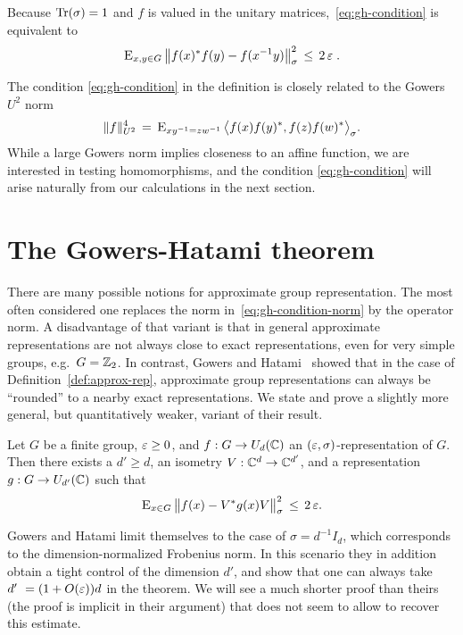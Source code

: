 Because $\mbox{\rm Tr}(\sigma)=1$ and $f$ is valued in the unitary matrices,~\eqref{eq:gh-condition} is equivalent to 
\begin{equation}\label{eq:gh-condition-norm}
\textsc{E}_{x,y\in G} \, \big\| f(x)^*f(y) - f(x^{-1}y) \big\|_\sigma^2 \,\leq\, 2\,\varepsilon\;.
\end{equation} 

\begin{remark}
The condition \eqref{eq:gh-condition} in the definition is closely related to the Gowers $U^2$ norm
$$\|f\|_{U^2}^4 \,=\, \textsc{E}_{xy^{-1}=zw^{-1}}\, \big\langle f(x)f(y)^* ,f(z)f(w)^* \big\rangle_\sigma.$$
While a large Gowers norm implies closeness to an affine function, we are interested in testing homomorphisms, and the condition \eqref{eq:gh-condition} will arise naturally from our calculations in the next section. 
\end{remark}

\section{The Gowers-Hatami theorem}

There are many possible notions for approximate group representation. The most often considered one replaces the norm in~\eqref{eq:gh-condition-norm} by the operator norm. A disadvantage of that variant is that in general approximate representations are not always close to exact representations, even for very simple groups, e.g.\ $G=\mathbb{Z}_2$. In contrast, 
Gowers and Hatami~\cite{gowers2015inverse} showed that in the case of Definition~\ref{def:approx-rep}, approximate group representations can always be ``rounded'' to a nearby exact representations. We state and prove a slightly more general, but quantitatively weaker, variant of their result.

\begin{theorem}\label{thm:gh}
Let $G$ be a finite group, $\varepsilon\geq 0$, and $f:G\to U_d(\mathbb{C})$ an $(\varepsilon,\sigma)$-representation of $G$. Then there exists a $d'\geq d$, an isometry $V:\mathbb{C}^d\to \mathbb{C}^{d'}$, and a representation $g:G\to U_{d'}(\mathbb{C})$ such that 
$$\textsc{E}_{x\in G}\, \big\| f(x) - V^*g(x)V \big\|_\sigma^2\, \leq\, 2\,\varepsilon.$$ 
\end{theorem}

Gowers and Hatami limit themselves to the case of $\sigma = d^{-1}I_d$, which corresponds to the dimension-normalized Frobenius norm. In this scenario they in addition obtain a tight control of the dimension $d'$, and show that one can always take $d'\ = (1+O(\varepsilon))d$ in the theorem. We will see a much shorter proof than theirs (the proof is implicit in their argument) that does not seem to allow to recover this estimate. 

